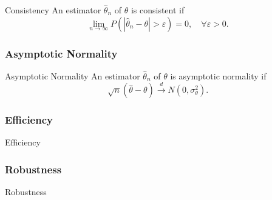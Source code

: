 \begin{definition}{Consistency}{}
    An estimator $\hat{\theta}_n$ of $\theta$ is consistent if
    \begin{equation}
        \lim_{n\rightarrow\infty}P\left(\left|\hat{\theta}_n-\theta\right|>\varepsilon\right)=0,\quad\forall\varepsilon>0.
    \end{equation}
\end{definition}

\begin{example}
    
\end{example}

\begin{example}
    
\end{example}

\subsubsection*{Asymptotic Normality}

\begin{definition}{Asymptotic Normality}{}
    An estimator $\hat{\theta}_n$ of $\theta$ is asymptotic normality if
    \begin{equation}
        \sqrt{n}\left(\hat{\theta}-\theta\right)\stackrel{d}{\rightarrow}N\left(0,\sigma_{\theta}^{2}\right).
    \end{equation}
\end{definition}

\subsubsection*{Efficiency}

\begin{definition}{Efficiency}{}
    
\end{definition}

\subsubsection*{Robustness}

\begin{definition}{Robustness}{}
    
\end{definition}
